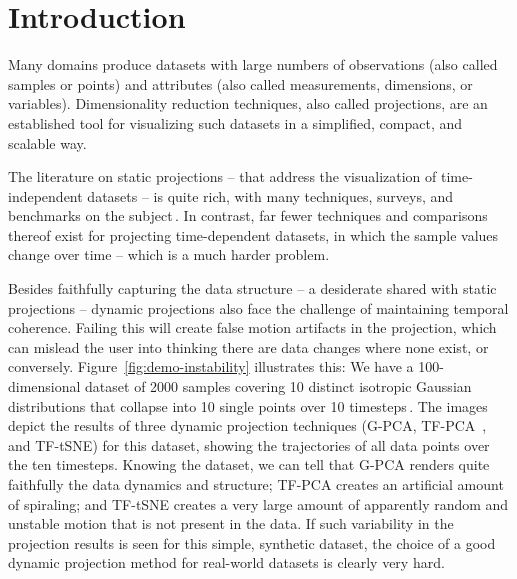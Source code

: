 \section{Introduction}
%

Many domains produce datasets with large numbers of observations (also called samples or points) and attributes (also called measurements, dimensions, or variables). Dimensionality reduction techniques, also called projections, are an established tool for visualizing such datasets in a simplified, compact, and scalable way.

The literature on static projections -- that address the visualization of time-independent datasets -- is quite rich, with many techniques, surveys, and benchmarks on the subject\,\citep{Nonato2019,Espadoto19,sorzano14_survey,cunningham15_survey}. In contrast, far fewer techniques and comparisons thereof exist for projecting time-dependent datasets, in which the sample values change over time -- which is a much harder problem.

Besides faithfully capturing the data structure -- a desiderate shared with static projections -- dynamic projections also face the challenge of maintaining temporal coherence. Failing this will create false motion artifacts in the projection, which can mislead the user into thinking there are data changes where none exist, or conversely. Figure~\ref{fig:demo-instability} illustrates this: We have a 100-dimensional dataset of 2000 samples covering 10 distinct isotropic Gaussian distributions that collapse into 10 single points over 10 timesteps\,\citep{Rauber2016}. The images depict the results of three dynamic projection techniques (G-PCA, TF-PCA~\citep{pca}, and TF-tSNE\citep{vanderMaaten2008}) for this dataset, showing the trajectories of all data points over the ten timesteps. Knowing the dataset, we can tell that G-PCA renders quite faithfully the data dynamics and structure; TF-PCA creates an artificial amount of spiraling; and TF-tSNE creates a very large amount of apparently random and unstable motion that is not present in the data. If such variability in the projection results is seen for this simple, synthetic dataset, the choice of a good dynamic projection method for real-world datasets is clearly very hard.



